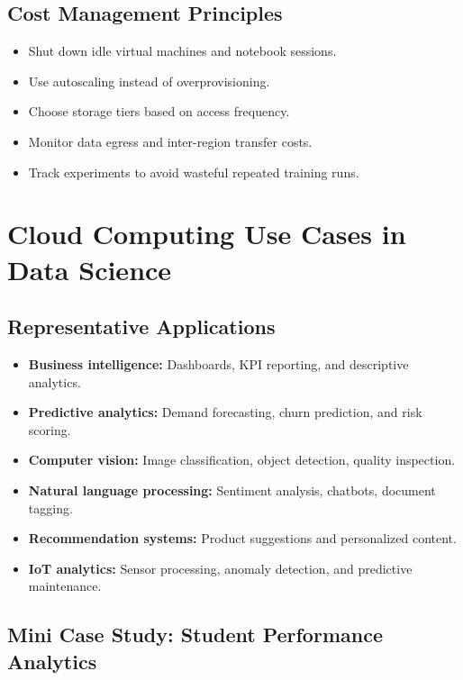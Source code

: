 \documentclass[11pt,a4paper]{article}
\begin{document}
\subsection{Cost Management Principles}

\begin{itemize}[leftmargin=*]
  \item Shut down idle virtual machines and notebook sessions.
  \item Use autoscaling instead of overprovisioning.
  \item Choose storage tiers based on access frequency.
  \item Monitor data egress and inter-region transfer costs.
  \item Track experiments to avoid wasteful repeated training runs.
\end{itemize}

\section{Cloud Computing Use Cases in Data Science}

\subsection{Representative Applications}

\begin{itemize}[leftmargin=*]
  \item \textbf{Business intelligence:} Dashboards, KPI reporting, and descriptive analytics.
  \item \textbf{Predictive analytics:} Demand forecasting, churn prediction, and risk scoring.
  \item \textbf{Computer vision:} Image classification, object detection, quality inspection.
  \item \textbf{Natural language processing:} Sentiment analysis, chatbots, document tagging.
  \item \textbf{Recommendation systems:} Product suggestions and personalized content.
  \item \textbf{IoT analytics:} Sensor processing, anomaly detection, and predictive maintenance.
\end{itemize}

\subsection{Mini Case Study: Student Performance Analytics}
\end{document}
